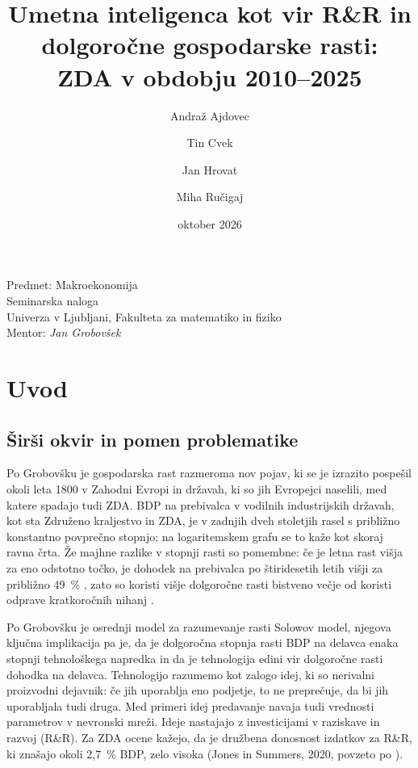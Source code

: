 \documentclass[12pt,a4paper]{article}
\title{\textbf{Umetna inteligenca kot vir R\&R in dolgoročne gospodarske rasti:}\\
ZDA v obdobju 2010--2025}
\author{
Andraž Ajdovec \and Tin Cvek \and Jan Hrovat \and Miha Ručigaj
}
\date{oktober 2026}
\begin{document}
\maketitle
\thispagestyle{empty}

\vfill
\begin{center}
Predmet: Makroekonomija\\
Seminarska naloga\\
Univerza v Ljubljani, Fakulteta za matematiko in fiziko\\
Mentor: \textit{Jan Grobovšek}
\end{center}
\vfill

\newpage
\tableofcontents
\newpage



\section{Uvod}\label{sec:uvod}

\subsection{Širši okvir in pomen problematike}
Po Grobovšku \parencite*[pros.~3 in~5]{grobovsek2026} je gospodarska rast razmeroma nov pojav, ki se je izrazito pospešil okoli leta 1800 v Zahodni Evropi in državah, ki so jih Evropejci naselili, med katere spadajo tudi ZDA. BDP na prebivalca v vodilnih industrijskih državah, kot sta Združeno kraljestvo in ZDA, je v zadnjih dveh stoletjih rasel s približno konstantno povprečno stopnjo; na logaritemskem grafu se to kaže kot skoraj ravna črta. Že majhne razlike v stopnji rasti so pomembne: če je letna rast višja za eno odstotno točko, je dohodek na prebivalca po štiridesetih letih višji za približno 49~\% \parencite[str.~4]{polanec_rast}, zato so koristi višje dolgoročne rasti bistveno večje od koristi odprave kratkoročnih nihanj \parencite[str.~56]{garin2021}.

Po Grobovšku \parencite*[pros.~59, 115--117 in~124]{grobovsek2026} je osrednji model za razumevanje rasti Solowov model, njegova ključna implikacija pa je, da je dolgoročna stopnja rasti BDP na delavca enaka stopnji tehnološkega napredka in da je tehnologija edini vir dolgoročne rasti dohodka na delavca. Tehnologijo razumemo kot zalogo idej, ki so nerivalni proizvodni dejavnik: če jih uporablja eno podjetje, to ne preprečuje, da bi jih uporabljala tudi druga. Med primeri idej predavanje navaja tudi vrednosti parametrov v nevronski mreži. Ideje nastajajo z investicijami v raziskave in razvoj (R\&R). Za ZDA ocene kažejo, da je družbena donosnost izdatkov za R\&R, ki znašajo okoli 2,7~\% BDP, zelo visoka (Jones in Summers, 2020, povzeto po \cite[pros.~131]{grobovsek2026}).
\end{document}
